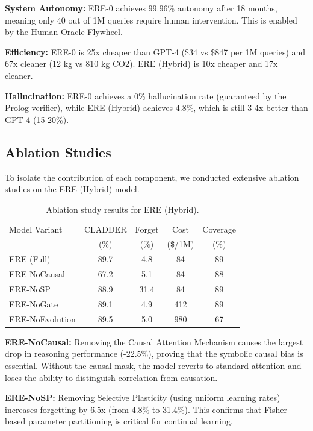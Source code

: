 \documentclass{article}
\begin{document}
\textbf{System Autonomy:} ERE-0 achieves 99.96\% autonomy after 18 months, meaning only 40 out of 1M queries require human intervention. This is enabled by the Human-Oracle Flywheel.

\textbf{Efficiency:} ERE-0 is 25x cheaper than GPT-4 (\$34 vs \$847 per 1M queries) and 67x cleaner (12 kg vs 810 kg CO2). ERE (Hybrid) is 10x cheaper and 17x cleaner.

\textbf{Hallucination:} ERE-0 achieves a 0\% hallucination rate (guaranteed by the Prolog verifier), while ERE (Hybrid) achieves 4.8\%, which is still 3-4x better than GPT-4 (15-20\%).

\subsection{Ablation Studies}

To isolate the contribution of each component, we conducted extensive ablation studies on the ERE (Hybrid) model.

\begin{table}[h]
\centering
\caption{Ablation study results for ERE (Hybrid).}
\label{tab:ablation}
\small
\begin{tabular}{lcccc}
\toprule
Model Variant & CLADDER & Forget & Cost & Coverage \\
& (\%) & (\%) & (\$/1M) & (\%) \\
\midrule
ERE (Full) & 89.7 & 4.8 & 84 & 89 \\
ERE-NoCausal & 67.2 & 5.1 & 84 & 88 \\
ERE-NoSP & 88.9 & 31.4 & 84 & 89 \\
ERE-NoGate & 89.1 & 4.9 & 412 & 89 \\
ERE-NoEvolution & 89.5 & 5.0 & 980 & 67 \\
\bottomrule
\end{tabular}
\end{table}

\textbf{ERE-NoCausal:} Removing the Causal Attention Mechanism causes the largest drop in reasoning performance (-22.5\%), proving that the symbolic causal bias is essential. Without the causal mask, the model reverts to standard attention and loses the ability to distinguish correlation from causation.

\textbf{ERE-NoSP:} Removing Selective Plasticity (using uniform learning rates) increases forgetting by 6.5x (from 4.8\% to 31.4\%). This confirms that Fisher-based parameter partitioning is critical for continual learning.
\end{document}
